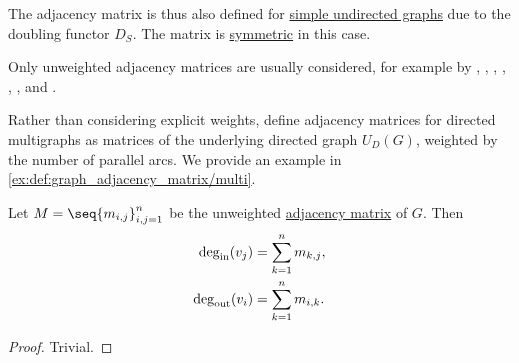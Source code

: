 \begin{comments}
  \item The adjacency matrix is thus also defined for \hyperref[def:undirected_graph]{simple undirected graphs} due to the doubling functor \hyperref[def:graph_functors/simple_doubling]{\( D_S \)}. The matrix is \hyperref[def:transpose_matrix]{symmetric} in this case.

  \item Only unweighted adjacency matrices are usually considered, for example by , , , , , ,  and .

  \item Rather than considering explicit weights,  define adjacency matrices for directed multigraphs as matrices of the underlying directed graph \hyperref[def:graph_functors/directed_forgetful]{\( U_D(G) \)}, weighted by the number of parallel arcs. We provide an example in \cref{ex:def:graph_adjacency_matrix/multi}.
\end{comments}

\begin{proposition}\label{thm:adjacency_matrix_degree}
  Let \( M = \seq{ m_{i,j} }_{i,j=1}^n \) be the unweighted \hyperref[def:graph_adjacency_matrix]{adjacency matrix} of \( G \). Then
  \begin{align*}
    \deg_{\op{in}}(v_j)  &= \sum_{k=1}^n m_{k,j}, \\
    \deg_{\op{out}}(v_i) &= \sum_{k=1}^n m_{i,k}.
  \end{align*}
\end{proposition}
\begin{proof}
  Trivial.
\end{proof}

